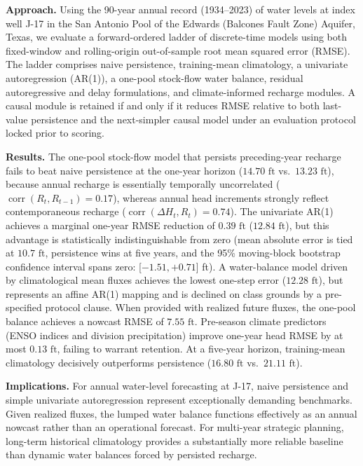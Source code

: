 \documentclass[11pt]{article}
\begin{document}
\textbf{Approach.} Using the 90-year annual record (1934--2023) of water
levels at index well J-17 in the San Antonio Pool of the Edwards
(Balcones Fault Zone) Aquifer, Texas, we evaluate a forward-ordered
ladder of discrete-time models using both fixed-window and
rolling-origin out-of-sample root mean squared error (RMSE). The ladder
comprises naive persistence, training-mean climatology, a univariate
autoregression (AR(1)), a one-pool stock-flow water balance, residual
autoregressive and delay formulations, and climate-informed recharge
modules. A causal module is retained if and only if it reduces RMSE
relative to both last-value persistence and the next-simpler causal
model under an evaluation protocol locked prior to scoring.

\textbf{Results.} The one-pool stock-flow model that persists
preceding-year recharge fails to beat naive persistence at the one-year
horizon (\(14.70\text{ ft}\) vs.~\(13.23\text{ ft}\)), because annual
recharge is essentially temporally uncorrelated
(\(\operatorname{corr}(R_t, R_{t-1}) = 0.17\)), whereas annual head
increments strongly reflect contemporaneous recharge
(\(\operatorname{corr}(\Delta H_t, R_t) = 0.74\)). The univariate AR(1)
achieves a marginal one-year RMSE reduction of \(0.39\text{ ft}\)
(\(12.84\text{ ft}\)), but this advantage is statistically
indistinguishable from zero (mean absolute error is tied at
\(10.7\text{ ft}\), persistence wins at five years, and the 95\%
moving-block bootstrap confidence interval spans zero:
{[}\(-1.51, +0.71\){]} ft). A water-balance model driven by
climatological mean fluxes achieves the lowest one-step error
(\(12.28\text{ ft}\)), but represents an affine AR(1) mapping and is
declined on class grounds by a pre-specified protocol clause. When
provided with realized future fluxes, the one-pool balance achieves a
nowcast RMSE of \(7.55\text{ ft}\). Pre-season climate predictors (ENSO
indices and division precipitation) improve one-year head RMSE by at
most \(0.13\text{ ft}\), failing to warrant retention. At a five-year
horizon, training-mean climatology decisively outperforms persistence
(\(16.80\text{ ft}\) vs.~\(21.11\text{ ft}\)).

\textbf{Implications.} For annual water-level forecasting at J-17, naive
persistence and simple univariate autoregression represent exceptionally
demanding benchmarks. Given realized fluxes, the lumped water balance
functions effectively as an annual nowcast rather than an operational
forecast. For multi-year strategic planning, long-term historical
climatology provides a substantially more reliable baseline than dynamic
water balances forced by persisted recharge.
\end{document}
